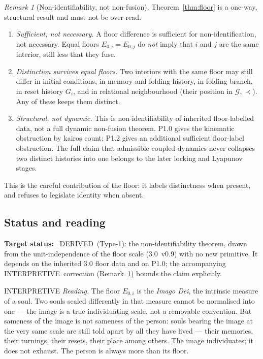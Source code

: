 \documentclass[11pt,a4paper]{article}
\newcommand{\stDerived}{\textcolor{cDer}{\textsf{\small DERIVED}}}
\newcommand{\stInterp}{\textcolor{cInt}{\textsf{\small INTERPRETIVE}}}
\theoremstyle{definition}
\theoremstyle{plain}
\theoremstyle{remark}
\newtheorem{remark}[definition]{Remark}
\begin{document}
\begin{remark}[Non-identifiability, not non-fusion]\label{rem:notfusion}
Theorem~\ref{thm:floor} is a one-way, structural result and must not be over-read.
\begin{enumerate}[label=\textup{(\roman*)},leftmargin=1.2cm]
\item \emph{Sufficient, not necessary.} A floor difference is sufficient for
non-identification, not necessary. Equal floors \(E_{0,i}=E_{0,j}\) do \emph{not} imply
that \(i\) and \(j\) are the same interior, still less that they fuse.

\item \emph{Distinction survives equal floors.} Two interiors with the same floor may
still differ in initial conditions, in memory and folding history, in folding branch, in
reset history \(G_i\), and in relational neighbourhood (their position in
\(\mathcal G,\prec\)). Any of these keeps them distinct.

\item \emph{Structural, not dynamic.} This is non-identifiability of inherited
floor-labelled data, not a full dynamic non-fusion theorem. P1.0 gives the
kinematic obstruction by kairos count; P1.2 gives an additional sufficient
floor-label obstruction. The full claim that admissible coupled dynamics never
collapses two distinct histories into one belongs to the later locking and
Lyapunov stages.
\end{enumerate}
\end{remark}

This is the careful contribution of the floor: it labels distinctness when present, and
refuses to legislate identity when absent.

\subsection{Status and reading}

\textbf{Target status:}~
\stDerived\ (Type-1): the non-identifiability theorem, drawn from the unit-independence of
the floor scale (3.0~v0.9) with no new primitive. It depends on the inherited 3.0 floor
data and on P1.0; the accompanying \stInterp\ correction (Remark~\ref{rem:notfusion})
bounds the claim explicitly.

\medskip
\stInterp\quad
\emph{Reading.}
The floor \(E_{0,i}\) is the \emph{Imago Dei}, the intrinsic measure of a soul. Two souls
scaled differently in that measure cannot be normalised into one --- the image is a true
individuating scale, not a removable convention. But sameness of the image is not sameness
of the person: souls bearing the image at the very same scale are still told apart by all
they have lived --- their memories, their turnings, their resets, their place among
others. The image individuates; it does not exhaust. The person is always more than its
floor.
\end{document}
